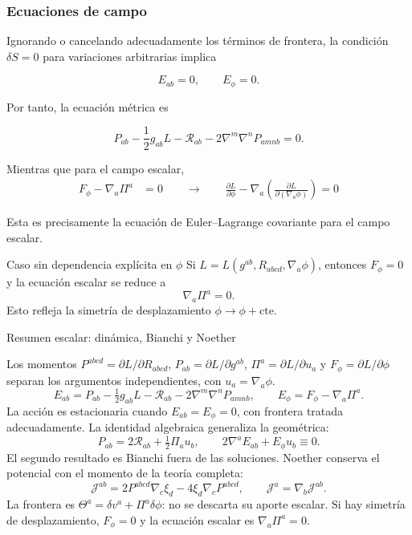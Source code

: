 \documentclass{beamer}
\newcommand{\Rcal}{\mathcal{R}}
\newcommand{\CompactDisplaySpacing}{%
  \setlength{\abovedisplayskip}{2pt plus 1pt minus 1pt}%
  \setlength{\belowdisplayskip}{2pt plus 1pt minus 1pt}%
  \setlength{\abovedisplayshortskip}{0pt plus 1pt}%
  \setlength{\belowdisplayshortskip}{1pt plus 1pt}%
}
\begin{document}
\begin{frame}[label=nav-frame-089]
	\frametitle{Ecuaciones de campo}
\linespread{.96}\selectfont\CompactDisplaySpacing
	\scriptsize
	\CompactDisplaySpacing

	Ignorando o cancelando adecuadamente los términos de frontera,
	la condición \(\delta S=0\) para variaciones arbitrarias implica

	\[
	\boxed{
		E_{ab}=0,
		\qquad
		E_\phi=0.
	}
	\]

	Por tanto, la ecuación métrica es

	\begin{equation}
		\boxed{
			P_{ab}
			-\frac12g_{ab}L
			-\Rcal_{ab}
			-2\nabla^m\nabla^nP_{amnb}
			=
			0.
		}
		\label{eq:campo-metrico-generalizado}
	\end{equation}

	Mientras que para el campo escalar,
	\begin{align}
		F_\phi-\nabla_a\Pi^a&=0 \qquad \longrightarrow \qquad
		\boxed{
			\frac{\partial L}{\partial\phi}
			-
			\nabla_a
			\left(
			\frac{\partial L}
			{\partial(\nabla_a\phi)}
			\right)
			=0}
		\label{eq:euler-lagrange-escalar}
	\end{align}

	Esta es precisamente la ecuación de Euler--Lagrange covariante
	para el campo escalar.

	\begin{block}{Caso sin dependencia explícita en \(\phi\)}
		Si $L=L(g^{ab},R_{abcd},\nabla_a\phi)$, entonces \(F_\phi=0\) y la ecuación escalar se reduce a
		\[
		\boxed{\nabla_a\Pi^a=0.}
		\]
		Esto refleja la simetría de desplazamiento
		\(\phi\rightarrow\phi+\text{cte}\).
	\end{block}

\end{frame}






\begin{frame}[label=nav-frame-090]{Resumen escalar: dinámica, Bianchi y Noether}
\footnotesize\CompactDisplaySpacing
Los momentos $P^{abcd}=\partial L/\partial R_{abcd}$, $P_{ab}=\partial L/\partial g^{ab}$, $\Pi^a=\partial L/\partial u_a$ y $F_\phi=\partial L/\partial\phi$ separan los argumentos independientes, con $u_a=\nabla_a\phi$.
\[
E_{ab}=P_{ab}-\tfrac12g_{ab}L-\Rcal_{ab}-2\nabla^m\nabla^nP_{amnb},\qquad
E_\phi=F_\phi-\nabla_a\Pi^a.
\]
La acción es estacionaria cuando $E_{ab}=E_\phi=0$, con frontera tratada adecuadamente. La identidad algebraica generaliza la geométrica:
\[
P_{ab}=2\Rcal_{ab}+\tfrac12\Pi_a u_b,\qquad
2\nabla^aE_{ab}+E_\phi u_b\equiv0.
\]
El segundo resultado es Bianchi fuera de las soluciones. Noether conserva el potencial con el momento de la teoría completa:
\[
\mathcal J^{ab}=2P^{abcd}\nabla_c\xi_d-4\xi_d\nabla_cP^{abcd},\qquad
\mathcal J^a=\nabla_b\mathcal J^{ab}.
\]
La frontera es $\Theta^a=\delta v^a+\Pi^a\delta\phi$: no se descarta su aporte escalar. Si hay simetría de desplazamiento, $F_\phi=0$ y la ecuación escalar es $\nabla_a\Pi^a=0$.
\end{frame}
\end{document}
